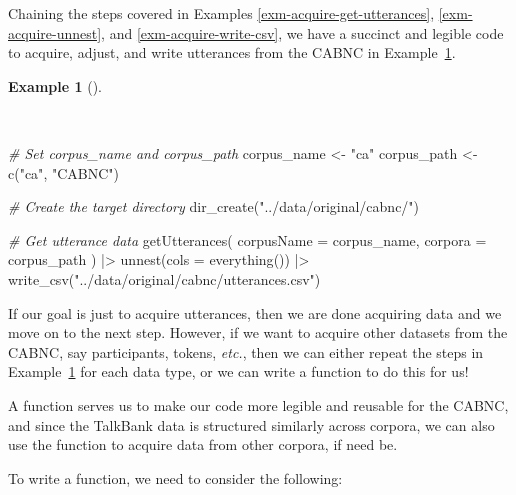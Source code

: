 \documentclass[
  letterpaper,
  krantz1]{latex/krantz-mod}
\newenvironment{Shaded}{\begin{snugshade}}{\end{snugshade}}
\newcommand{\AttributeTok}[1]{\textcolor[rgb]{0.00,0.00,0.00}{#1}}
\newcommand{\CommentTok}[1]{\textcolor[rgb]{0.00,0.00,0.00}{\textit{#1}}}
\newcommand{\FunctionTok}[1]{\textcolor[rgb]{0.00,0.00,0.00}{#1}}
\newcommand{\NormalTok}[1]{\textcolor[rgb]{0.00,0.00,0.00}{#1}}
\newcommand{\OtherTok}[1]{\textcolor[rgb]{0.00,0.00,0.00}{#1}}
\newcommand{\SpecialCharTok}[1]{\textcolor[rgb]{0.00,0.00,0.00}{#1}}
\newcommand{\StringTok}[1]{\textcolor[rgb]{0.00,0.00,0.00}{#1}}
\theoremstyle{definition}
\theoremstyle{definition}
\newtheorem{example}{Example}[chapter]
\theoremstyle{remark}
\begin{document}
Chaining the steps covered in Examples \ref{exm-acquire-get-utterances},
\ref{exm-acquire-unnest}, and \ref{exm-acquire-write-csv}, we have a
succinct and legible code to acquire, adjust, and write utterances from
the CABNC in Example~\ref{exm-acquire-get-unnest-write-csv}.

\begin{example}[]\protect\hypertarget{exm-acquire-get-unnest-write-csv}{}\label{exm-acquire-get-unnest-write-csv}

~

\begin{Shaded}
\begin{Highlighting}[numbers=left,,]
\CommentTok{\# Set corpus\_name and corpus\_path}
\NormalTok{corpus\_name }\OtherTok{\textless{}{-}} \StringTok{"ca"}
\NormalTok{corpus\_path }\OtherTok{\textless{}{-}} \FunctionTok{c}\NormalTok{(}\StringTok{"ca"}\NormalTok{, }\StringTok{"CABNC"}\NormalTok{)}

\CommentTok{\# Create the target directory}
\FunctionTok{dir\_create}\NormalTok{(}\StringTok{"../data/original/cabnc/"}\NormalTok{)}

\CommentTok{\# Get utterance data}
\FunctionTok{getUtterances}\NormalTok{(}
  \AttributeTok{corpusName =}\NormalTok{ corpus\_name,}
  \AttributeTok{corpora =}\NormalTok{ corpus\_path}
\NormalTok{) }\SpecialCharTok{|\textgreater{}}
  \FunctionTok{unnest}\NormalTok{(}\AttributeTok{cols =} \FunctionTok{everything}\NormalTok{()) }\SpecialCharTok{|\textgreater{}}
  \FunctionTok{write\_csv}\NormalTok{(}\StringTok{"../data/original/cabnc/utterances.csv"}\NormalTok{)}
\end{Highlighting}
\end{Shaded}

\end{example}

If our goal is just to acquire utterances, then we are done acquiring
data and we move on to the next step. However, if we want to acquire
other datasets from the CABNC, say participants, tokens, \emph{etc.},
then we can either repeat the steps in
Example~\ref{exm-acquire-get-unnest-write-csv} for each data type, or we
can write a function to do this for us!

A function serves us to make our code more legible and reusable for the
CABNC, and since the TalkBank data is structured similarly across
corpora, we can also use the function to acquire data from other
corpora, if need be.

To write a function, we need to consider the following:
\end{document}
